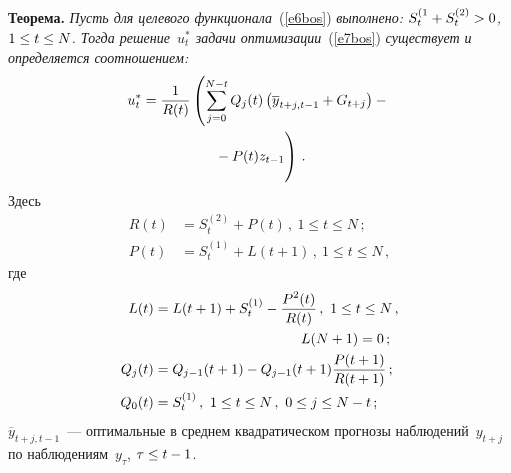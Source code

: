 \begin{multicols}{2}
  \noindent
  \textbf{Теорема.} \textit{Пусть для целевого функционала}~(\ref{e6bos}) 
\textit{выполнено: $S_t^{(1}+S_t^{(2)}\hm>0$, $1\hm\leq t\hm\leq N$.
  Тогда решение~$u_t^*$ задачи оптимизации}~(\ref{e7bos}) \textit{существует и определяется 
соотношением:}
    \begin{multline}
  u_t^* =\fr{1}{R(t)}\left ( \sum\limits_{j=0}^{N-t}
  Q_j(t)\left(\overline{y}_{t+j,t-1}+G_{t+j}\right)-{}\right.\\
\left. \vphantom{\sum\limits_{j=0}^{N-t}} {}-P(t)z_{t-1}\right)\,.
  \label{e8bos}
  \end{multline}
  Здесь
  \begin{align*}
  R(t) &= S_t^{(2)}+P(t)\,,\ 1\leq t\leq N\,;\\
  P(t) &= S_t^{(1)}+L(t+1)\,,\ 1\leq t \leq N\,,
  \end{align*}
  где
  \begin{align*}
  L(t) &= L(t+1)+S_t^{(1)}-\fr{P^2(t)}{R(t)}\,,\ 1\leq t\leq N\,,\\
&  \hspace{37mm}L(N+1)=0\,;\\
  Q_j(t) &=Q_{j-1}(t+1)-Q_{j-1}(t+1)\fr{P(t+1)}{R(t+1)}\,;\\
  Q_0(t) &= S_t^{(1)}\,,\ 1\leq t\leq N\,,\ 0\leq j\leq N-t\,;
  \end{align*}
$\overline{y}_{t+j,t-1}$~--- оптимальные в среднем квадратическом прогнозы 
наблюдений~$y_{t+j}$ по наблюдениям~$y_\tau$, $\tau\hm\leq t-1$.
  \medskip
  

\end{multicols}
